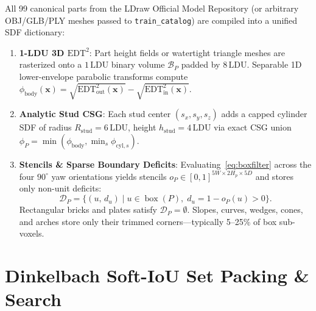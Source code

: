\documentclass[11pt,twoside]{article}
\newcommand{\ldu}{\,\text{LDU}}
\newcommand{\code}[1]{\texttt{#1}}
\begin{document}
All 99 canonical parts from the LDraw Official Model Repository (or arbitrary OBJ/GLB/PLY meshes passed to \code{train\_catalog}) are compiled into a unified SDF dictionary:
\begin{enumerate}[leftmargin=*,nosep]
  \item \textbf{1-LDU 3D $\mathrm{EDT}^2$}: Part height fields or watertight triangle meshes are rasterized onto a $1\ldu$ binary volume $\mathcal{B}_P$ padded by $8\ldu$. Separable 1D lower-envelope parabolic transforms compute $\phi_{\text{body}}(\mathbf{x}) = \sqrt{\mathrm{EDT}^2_{\text{out}}(\mathbf{x})} - \sqrt{\mathrm{EDT}^2_{\text{in}}(\mathbf{x})}$.
  \item \textbf{Analytic Stud CSG}: Each stud center $(s_x,s_y,s_z)$ adds a capped cylinder SDF of radius $R_{\text{stud}} = 6\ldu$, height $h_{\text{stud}} = 4\ldu$ via exact CSG union $\phi_P = \min(\phi_{\text{body}}, \min_s \phi_{\text{cyl},s})$.
  \item \textbf{Stencils \& Sparse Boundary Deficits}: Evaluating~\eqref{eq:boxfilter} across the four $90^\circ$ yaw orientations yields stencils $o_P \in [0,1]^{5W \times 2H_p \times 5D}$ and stores only non-unit deficits:
  \begin{equation}
    \mathcal{D}_P = \bigl\{(u,\, d_u) \;\big|\; u \in \operatorname{box}(P),\; d_u = 1 - o_P(u) > 0\bigr\}.
  \end{equation}
  Rectangular bricks and plates satisfy $\mathcal{D}_P = \emptyset$. Slopes, curves, wedges, cones, and arches store only their trimmed corners—typically 5--25\% of box sub-voxels.
\end{enumerate}

\section{Dinkelbach Soft-IoU Set Packing \& Search}
\end{document}
